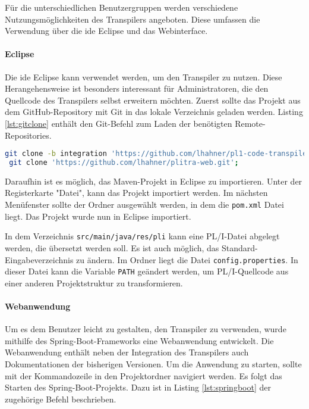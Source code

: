 Für die unterschiedlichen Benutzergruppen werden verschiedene Nutzungsmöglichkeiten des Transpilers angeboten. Diese umfassen die Verwendung über die \ac{ide} Eclipse und das Webinterface.

\paragraph*{Eclipse}
Die \ac{ide} Eclipse kann verwendet werden, um den Transpiler zu nutzen. Diese Herangehensweise ist besonders interessant für Administratoren, die den Quellcode des Transpilers selbst erweitern möchten.
Zuerst sollte das Projekt aus dem GitHub-Repository mit Git in das lokale Verzeichnis geladen werden.
Listing \ref{lst:gitclone} enthält den Git-Befehl zum Laden der benötigten Remote-Repositories. 

\begin{lstlisting}[language=bash, caption=Klonen der Transpiler Repositories, label={lst:gitclone}, basicstyle=\fontsize{9}{13}\selectfont\ttfamily]
 git clone -b integration 'https://github.com/lhahner/pl1-code-transpiler.git'; 
 git clone 'https://github.com/lhahner/plitra-web.git';
\end{lstlisting}

Daraufhin ist es möglich, das Maven-Projekt in Eclipse zu importieren. Unter der Registerkarte "Datei", kann das Projekt importiert werden. Im nächsten Menüfenster sollte der Ordner ausgewählt werden, in dem die \verb+pom.xml+ Datei liegt. Das Projekt wurde nun in Eclipse importiert. 

In dem Verzeichnis \verb+src/main/java/res/pli+ kann eine PL/I-Datei abgelegt werden, die übersetzt werden soll. Es ist auch möglich, das Standard-Eingabeverzeichnis zu ändern. Im Ordner  liegt die Datei \verb+config.properties+. In dieser Datei kann die Variable \verb+PATH+ geändert werden, um PL/I-Quellcode aus einer anderen Projektstruktur zu transformieren.

\paragraph*{Webanwendung}
Um es dem Benutzer leicht zu gestalten, den Transpiler zu verwenden, wurde mithilfe des Spring-Boot-Frameworks eine Webanwendung entwickelt.
Die Webanwendung enthält neben der Integration des Transpilers auch Dokumentationen der bisherigen Versionen.
Um die Anwendung zu starten, sollte mit der Kommandozeile in den Projektordner navigiert werden.
Es folgt das Starten des Spring-Boot-Projekts. Dazu ist in Listing \ref{lst:springboot} der zugehörige Befehl beschrieben.

